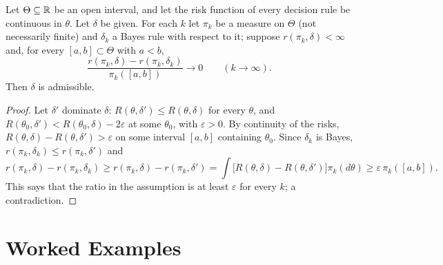 \documentclass[main.tex]{subfiles}
\begin{document}
\begin{theorem}\label{thm:blyth}
Let $\Theta\subseteq\mathbb{R}$ be an open interval, and let the risk function of every decision rule be continuous in $\theta$. Let $\delta$ be given. For each $k$ let $\pi_k$ be a measure on $\Theta$ (not necessarily finite) and $\delta_k$ a Bayes rule with respect to it; suppose $r(\pi_k,\delta)<\infty$ and, for every $[a,b]\subset\Theta$ with $a<b$,
\[
\frac{r(\pi_k,\delta)-r(\pi_k,\delta_k)}{\pi_k([a,b])}\to0\qquad(k\to\infty).
\]
Then $\delta$ is admissible.
\end{theorem}
\begin{proof}
Let $\delta'$ dominate $\delta$: $R(\theta,\delta')\le R(\theta,\delta)$ for every $\theta$, and $R(\theta_0,\delta')<R(\theta_0,\delta)-2\varepsilon$ at some $\theta_0$, with $\varepsilon>0$. By continuity of the risks, $R(\theta,\delta)-R(\theta,\delta')>\varepsilon$ on some interval $[a,b]$ containing $\theta_0$. Since $\delta_k$ is Bayes, $r(\pi_k,\delta_k)\le r(\pi_k,\delta')$ and
\[
r(\pi_k,\delta)-r(\pi_k,\delta_k)\ge r(\pi_k,\delta)-r(\pi_k,\delta')=\int\big[R(\theta,\delta)-R(\theta,\delta')\big]\pi_k(d\theta)\ge\varepsilon\,\pi_k([a,b]).
\]
This says that the ratio in the assumption is at least $\varepsilon$ for every $k$; a contradiction.
\end{proof}

\section{Worked Examples}
\end{document}
